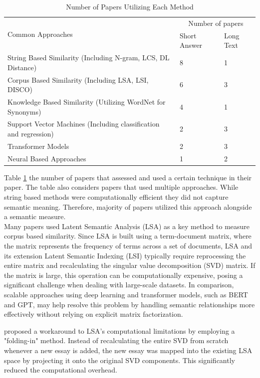 \documentclass{article}
\begin{document}
	\begin{table}[H]
		\begin{tabularx}{7in}{|X|m{0.8in}|m{0.8in}|}
			\hline
			\multirow{2}{*}{Common Approaches} & \multicolumn{2}{c|}{Number of papers} \\ \cline{2-3}
			& Short Answer & Long Text \\ \hline
			String Based Similarity (Including N-gram, LCS, DL Distance) & 8 & 1 \\
			Corpus Based Similarity (Including LSA, LSI, DISCO) & 6 & 3 \\
			Knowledge Based Similarity (Utilizing WordNet for Synonyms) & 4 & 1 \\
			Support Vector Machines (Including classification and regression) & 2 & 3 \\
			Transformer Models & 2 & 3 \\
			Neural Based Approaches & 1 & 2 \\ 
			\hline
		\end{tabularx}
		\caption{Number of Papers Utilizing Each Method}
		\label{tab::papertypes}
	\end{table}
	Table \ref{tab::papertypes} the number of papers that assessed and used a certain technique in their paper. The table also considers papers that used multiple approaches. While string based methods were computationally efficient they did not capture semantic meaning. Therefore, majority of papers utilized this approach alongside a semantic measure. \\ Many papers used Latent Semantic Analysis (LSA) as a key method to measure corpus based similarity. Since LSA is built using a term-document matrix, where the matrix represents the frequency of terms across a set of documents, LSA and its extension Latent Semantic Indexing (LSI) typically require reprocessing the entire matrix and recalculating the singular value decomposition (SVD) matrix. If the matrix is large, this operation can be computationally expensive, posing a significant challenge when dealing with large-scale datasets. In comparison, scalable approaches using deep learning and transformer models, such as BERT and GPT, may help resolve this problem by handling semantic relationships more effectively without relying on explicit matrix factorization.
	
	\textcite{17_abbas2015svm} proposed a workaround to LSA’s computational limitations by employing a "folding-in" method. Instead of recalculating the entire SVD from scratch whenever a new essay is added, the new essay was mapped into the existing LSA space by projecting it onto the original SVD components. This significantly reduced the computational overhead.
	
\end{document}
